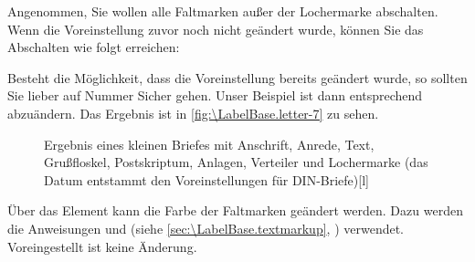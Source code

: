 \begin{Example}
  Angenommen, Sie wollen alle Faltmarken außer der Lochermarke
  abschalten. Wenn die Voreinstellung zuvor noch nicht geändert wurde, können
  Sie das Abschalten wie folgt erreichen:
\begin{lstcode}
\end{lstcode}
  Besteht die Möglichkeit, dass die Voreinstellung bereits geändert wurde, so
  sollten Sie lieber auf Nummer Sicher gehen. Unser Beispiel ist dann
  entsprechend abzuändern.%
  Das Ergebnis ist in \autoref{fig:\LabelBase.letter-7} zu sehen.
  \begin{figure}
    \setcapindent{0pt}%
    \begin{captionbeside}{Ergebnis eines kleinen Briefes mit Anschrift, Anrede,
        Text, Grußfloskel, Postskriptum, Anlagen, Verteiler und Lochermarke
        (das Datum entstammt den Voreinstellungen für DIN-Briefe)}[l]
    \end{captionbeside}
    \label{fig:\LabelBase.letter-7}
  \end{figure}
\end{Example}
%
Über das Element 
kann die Farbe der Faltmarken geändert werden. Dazu werden die Anweisungen
 und  (siehe
\autoref{sec:\LabelBase.textmarkup},
) verwendet. Voreingestellt ist
keine Änderung.%
\EndIndexGroup


